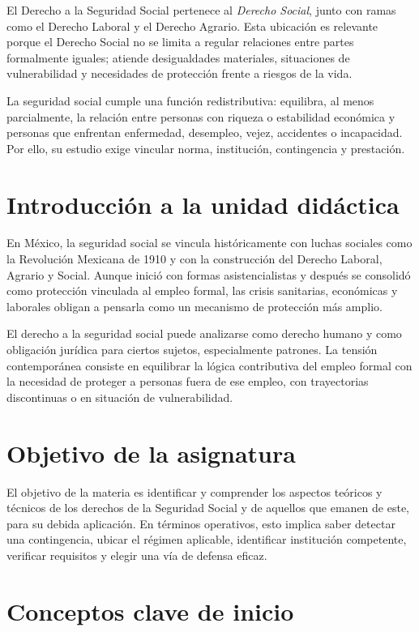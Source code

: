\documentclass[
  spanish,
  letterpaper, oneside
]{article}
\begin{document}
El Derecho a la Seguridad Social pertenece al \textit{Derecho Social}, junto con ramas como el Derecho Laboral y el Derecho Agrario. Esta ubicación es relevante porque el Derecho Social no se limita a regular relaciones entre partes formalmente iguales; atiende desigualdades materiales, situaciones de vulnerabilidad y necesidades de protección frente a riesgos de la vida.

La seguridad social cumple una función redistributiva: equilibra, al menos parcialmente, la relación entre personas con riqueza o estabilidad económica y personas que enfrentan enfermedad, desempleo, vejez, accidentes o incapacidad. Por ello, su estudio exige vincular norma, institución, contingencia y prestación.

\section{Introducción a la unidad didáctica}

En México, la seguridad social se vincula históricamente con luchas sociales como la Revolución Mexicana de 1910 y con la construcción del Derecho Laboral, Agrario y Social. Aunque inició con formas asistencialistas y después se consolidó como protección vinculada al empleo formal, las crisis sanitarias, económicas y laborales obligan a pensarla como un mecanismo de protección más amplio.

El derecho a la seguridad social puede analizarse como derecho humano y como obligación jurídica para ciertos sujetos, especialmente patrones. La tensión contemporánea consiste en equilibrar la lógica contributiva del empleo formal con la necesidad de proteger a personas fuera de ese empleo, con trayectorias discontinuas o en situación de vulnerabilidad.

\section{Objetivo de la asignatura}

El objetivo de la materia es identificar y comprender los aspectos teóricos y técnicos de los derechos de la Seguridad Social y de aquellos que emanen de este, para su debida aplicación. En términos operativos, esto implica saber detectar una contingencia, ubicar el régimen aplicable, identificar institución competente, verificar requisitos y elegir una vía de defensa eficaz.

\section{Conceptos clave de inicio}
\end{document}
